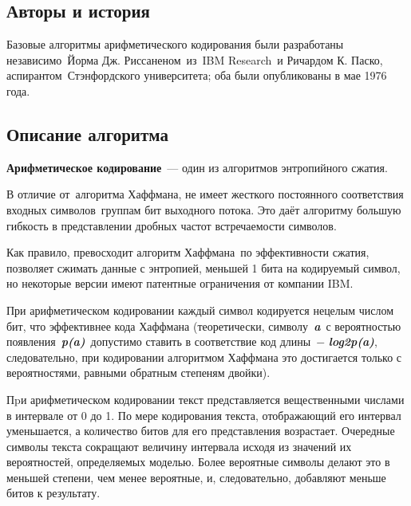\documentclass[12pt]{article}
\begin{document}
\newpage

\begin{center}
    \section*{Авторы и история}
\end{center}

Базовые алгоритмы арифметического кодирования были разработаны независимо~Йорма Дж. Риссаненом~из~IBM Research~и Ричардом К. Паско, аспирантом~Стэнфордского университета; оба были опубликованы в мае 1976 года.

\newpage

\begin{center}
    \section*{Описание алгоритма}
\end{center}

\textbf{Арифметическое кодирование}~--- один из алгоритмов энтропийного сжатия.

В отличие от~алгоритма Хаффмана, не имеет жесткого постоянного соответствия входных символов~группам бит выходного потока. Это даёт алгоритму большую гибкость в представлении дробных частот встречаемости символов.

Как правило, превосходит алгоритм Хаффмана~по эффективности сжатия, позволяет сжимать данные с энтропией, меньшей 1 бита на кодируемый символ, но некоторые версии имеют патентные ограничения от компании IBM.

При арифметическом кодировании каждый символ кодируется нецелым числом бит, что эффективнее кода Хаффмана (теоретически, символу~\textbf{\textit{a}}~с вероятностью появления~\textbf{\textit{p(a)}}~допустимо ставить в соответствие код длины~$\mathrm{-}$ \textbf{\textit{log2p(a)}}, следовательно, при кодировании алгоритмом Хаффмана это достигается только с вероятностями, равными обратным степеням двойки).

Пpи арифметическом кодировании текст представляется вещественными числами в интервале от 0 до 1. По мере кодирования текста, отображающий его интервал уменьшается, а количество битов для его представления возрастает. Очередные символы текста сокращают величину интервала исходя из значений их вероятностей, определяемых моделью. Более вероятные символы делают это в меньшей степени, чем менее вероятные, и, следовательно, добавляют меньше битов к результату.
\end{document}
